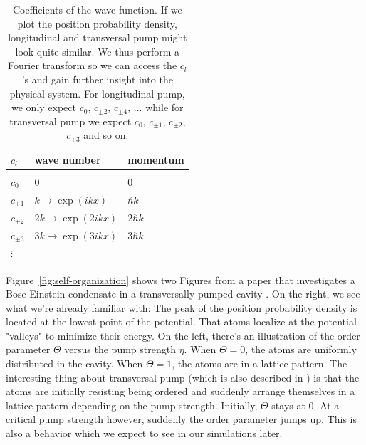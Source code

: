 \begin{table}[!htb]
\centering
\begin{tabular}{lll}
$c_l$    & wave number & momentum    \\
\hline \\
$c_0$    & 0           & 0           \\
$c_{\pm 1}$    & $k \rightarrow \exp(ikx)$         & $\hbar k$   \\
$c_{\pm 2}$    & $2k \rightarrow \exp(2ikx)$        & $2 \hbar k$ \\
$c_{\pm 3}$    & $3k \rightarrow \exp(3ikx)$        & $3 \hbar k$ \\
$\vdots$ &             &            
\end{tabular}
\caption{Coefficients of the wave function. If we plot the position probability density, longitudinal and transversal pump might look quite similar. We thus perform a Fourier transform so we can access the $c_l$'s and gain further insight into the physical system. For longitudinal pump, we only expect $c_0$, $c_{\pm 2}$, $c_{\pm 4}$, $\dots$ while for transversal pump we expect $c_0$, $c_{\pm 1}$, $c_{\pm 2}$, $c_{\pm 3}$ and so on.}
\end{table}
\label{wave_table}
\FloatBarrier

\noindent Figure~\ref{fig:self-organization} shows two Figures from a paper that investigates a Bose-Einstein condensate in a transversally pumped cavity \cite{Nagy2008}. On the right, we see what we're already familiar with: The peak of the position probability density is located at the lowest point of the potential. That atoms localize at the potential "valleys" to minimize their energy. On the left, there's an illustration of the order parameter $\Theta$ versus the pump strength $\eta$. When $\Theta = 0$, the atoms are uniformly distributed in the cavity. When $\Theta = 1$, the atoms are in a lattice pattern. The interesting thing about transversal pump (which is also described in \cite{domokos2002}) is that the atoms are initially resisting being ordered and suddenly arrange themselves in a lattice pattern depending on the pump strength. Initially, $\Theta$ stays at 0. At a critical pump strength however, suddenly the order parameter jumps up. This is also a behavior which we expect to see in our simulations later.

